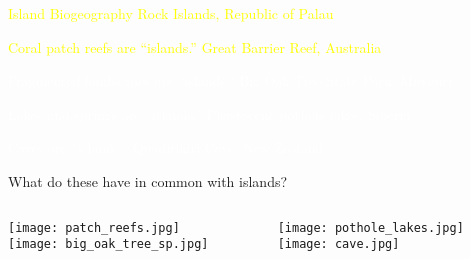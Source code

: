 \documentclass[t]{beamer}
\begin{document}

{
\begin{frame}[b]{\textcolor{yellow} {Island Biogeography}}
	\hfill \textcolor{yellow}{Rock Islands, Republic of Palau}
\end{frame}
}

{
\begin{frame}[b]{\textcolor{yellow} {Coral patch reefs are ``islands.''}}
	\hfill \textcolor{yellow}{Great Barrier Reef, Australia}
\end{frame}
}

{
\begin{frame}[b]{\textcolor{white} {Fragmented landscapes are ``islands.''}}
	\hfill \textcolor{white}{Big Oak Tree State Park, Missouri}
\end{frame}
}

{
\begin{frame}[b]{\textcolor{white} {Lakes and springs are ``islands.''}}
	\hfill \textcolor{white}{Pleistocene pothole lakes, Siberia}
\end{frame}
}

{
\begin{frame}[b]{\textcolor{white} {Caves are ``islands.''}}
	\hfill \textcolor{white}{Quadirikiri Cave, New Zealand}
\end{frame}
}

\begin{frame}{What do these have in common with islands?}
	\begin{columns}[T]
		\begin{column}{0.5\textwidth}
			\centering
			\texttt{[image: patch\_reefs.jpg]}\\
			\texttt{[image: big\_oak\_tree\_sp.jpg]}
		\end{column}
		\begin{column}{0.5\textwidth}
			\centering
			\texttt{[image: pothole\_lakes.jpg]}\\
			\texttt{[image: cave.jpg]}
		\end{column}	
	\end{columns}
\end{frame}
\end{document}

